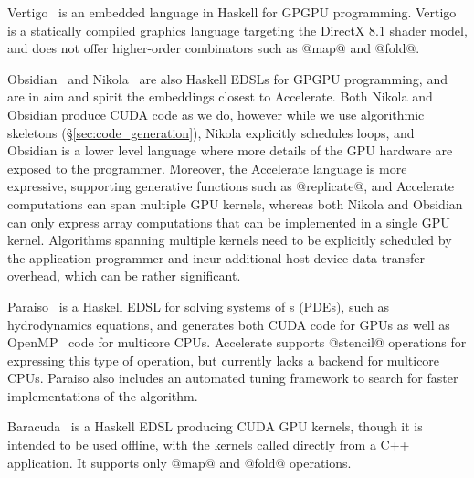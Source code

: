 
Vertigo~\cite{Elliott:2004hh} is an embedded language in Haskell for GPGPU
programming. Vertigo is a statically compiled graphics language targeting the
DirectX 8.1 shader model, and does not offer higher-order combinators such as
@map@ and @fold@.

Obsidian~\cite{Svensson:2008a} and Nikola~\cite{Mainland:2010vj} are also
Haskell EDSLs for GPGPU programming, and are in aim and spirit the embeddings
closest to Accelerate. Both Nikola and Obsidian produce CUDA code as we do,
however while we use algorithmic skeletons (\S\ref{sec:code_generation}), Nikola
explicitly schedules loops, and Obsidian is a lower level language where more
details of the GPU hardware are exposed to the programmer. Moreover, the
Accelerate language is more expressive, supporting generative functions such as
@replicate@, and Accelerate computations can span multiple GPU kernels, whereas
both Nikola and Obsidian can only express array computations that can be
implemented in a single GPU kernel. Algorithms spanning multiple kernels need to
be explicitly scheduled by the application programmer and incur additional
host-device data transfer overhead, which can be rather significant.


Paraiso~\cite{Muranushi:2012eh} is a Haskell EDSL for solving systems of
s (PDEs), such as hydrodynamics equations,
and generates both CUDA code for GPUs as well as OpenMP~\cite{OpenMP:2008} code
for multicore CPUs. Accelerate supports @stencil@ operations for expressing this
type of operation, but currently lacks a backend for multicore CPUs. Paraiso
also includes an automated tuning framework to search for faster implementations
of the algorithm.

Baracuda~\cite{Larsen:2011fa} is a Haskell EDSL producing CUDA GPU kernels,
though it is intended to be used offline, with the kernels called directly from
a C++ application. It supports only @map@ and @fold@ operations.


